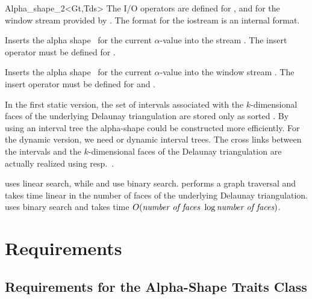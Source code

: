 \begin{ccClassTemplate} {Alpha_shape_2<Gt,Tds>}
The I/O operators are defined for , and for
the window stream provided by \cgal. The format for the iostream
is an internal format. 


{Inserts the alpha shape \ccVar\ for the current $\alpha$-value into the stream .
\ccPrecond The insert operator must be defined for .}



{Inserts the alpha shape \ccVar\ for the current $\alpha$-value into the window stream .
\ccPrecond The insert operator must be defined for  and .}
\end{ccClassTemplate}

\ccImplementation
In the first static version, the set of intervals associated with the
$k$-dimensional faces of the underlying Delaunay triangulation are
stored only as sorted . By using an interval tree the
alpha-shape could be constructed more efficiently. For the dynamic
version, we need  or dynamic interval trees. The
cross links between the intervals and the $k$-dimensional faces of the
Delaunay triangulation are actually realized using
 resp.\ .

 uses linear search, while 
 and  
use binary search.
 performs a graph traversal and takes time linear in the number of faces of the underlying Delaunay triangulation.
 uses binary search and takes time
$O(\mbox{\em number of faces } \log{\mbox{\em number of faces}})$.


\section{Requirements\label{I1_SectRequirements}}


\subsection{Requirements for the Alpha-Shape Traits Class} 

